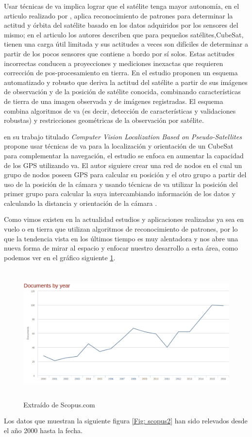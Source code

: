 Usar técnicas de \ac{va} implica lograr que el satélite tenga mayor autonomía, en el articulo realizado por \cite{Kouyama}, aplica reconocimiento de patrones para determinar la actitud y órbita del satélite basado en los datos adquiridos por los sensores del mismo; en el articulo los autores describen que para pequeños satélites,CubeSat, tienen una carga útil limitada y sus actitudes a veces son difíciles de determinar a partir de los pocos sensores que contiene a bordo por sí solos. Estas actitudes incorrectas conducen a proyecciones y mediciones inexactas que requieren corrección de pos-procesamiento en tierra. En el estudio proponen un esquema automatizado y robusto que deriva la actitud del satélite a partir de sus imágenes de observación y de la posición de satélite conocida, combinando características de tierra de una imagen observada y de imágenes registradas. El esquema combina algoritmos de \ac{va} (es decir, detección de características y validaciones robustas) y restricciones geométricas de la observación por satélite.

\cite{Huggins} en su trabajo titulado \textit{Computer Vision Localization Based on Pseudo-Satellites} propone usar técnicas de \ac{va} para la localización y orientación de un CubeSat para complementar la navegación, el estudio se enfoca en  aumentar la capacidad de los GPS utilizando \ac{va}. El autor siguiere crear una red de nodos en el cual un grupo de nodos poseen GPS para calcular su posición y el otro grupo a partir del uso de la posición de la cámara y usando técnicas de  \ac{va}  utilizar la posición del primer grupo para calcular la suya intercambiando información de los datos y calculando la distancia y orientación de la cámara \citep{Huggins}.

Como vimos existen en la actualidad estudios y aplicaciones realizadas ya sea en vuelo o en tierra que utilizan algoritmos de reconocimiento de patrones, por lo que la tendencia vista en los últimos tiempo es muy alentadora y nos abre una nueva forma de mirar al espacio y enfocar nuestro desarrollo a esta área, como podemos ver en el gráfico siguiente \ref{Fig: scopus1}. 

\begin{figure}[h]
 \centering
  \includegraphics[height=7cm,keepaspectratio=true,clip=true]{imagenes/Logos/scopus.png}
  \caption{Extraído de Scopus.com}
	\label{Fig: scopus1}
\end{figure}
Los datos que muestran la siguiente figura \ref{Fig: scopus2} han sido relevados desde el año 2000 hasta la fecha.


